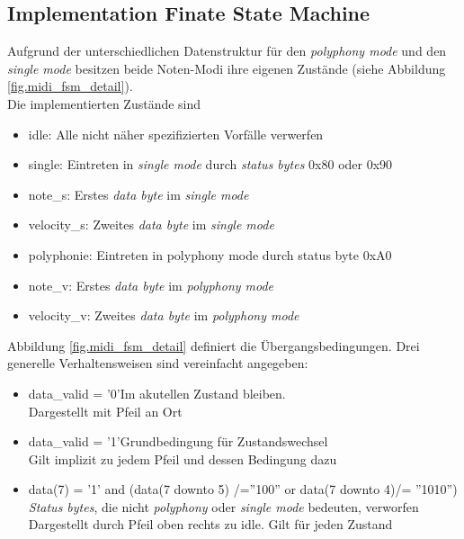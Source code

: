 \subsection{Implementation Finate State Machine}
Aufgrund der unterschiedlichen Datenstruktur für den \textit{polyphony mode} und den \textit{single mode} besitzen beide Noten-Modi ihre eigenen Zustände (siehe Abbildung \ref{fig.midi_fsm_detail}). \\ 
\newline
Die implementierten Zustände sind
\begin{itemize}
	\item idle: \hspace*{19mm}Alle nicht näher spezifizierten Vorfälle verwerfen
	\item single: \hspace*{16mm}Eintreten in  \textit{single mode} durch \textit{status bytes} 0x80 oder 0x90
	\item note\_s: \hspace*{15mm}Erstes \textit{data byte} im  \textit{single mode}
	\item velocity\_s: \hspace*{10mm}Zweites \textit{data byte} im \textit{single mode}
	\item polyphonie: \hspace*{8mm}Eintreten in polyphony mode durch status byte 0xA0
	\item note\_v:  \hspace*{15mm}Erstes \textit{data byte} im  \textit{polyphony mode}
	\item velocity\_v:  \hspace*{10mm}Zweites \textit{data byte} im  \textit{polyphony mode}
\end{itemize}


\newpage
Abbildung \ref{fig.midi_fsm_detail} definiert die Übergangsbedingungen. Drei generelle Verhaltensweisen sind vereinfacht angegeben:

\begin{itemize}
	\item data\_valid = '0'\hspace*{10mm}Im akutellen Zustand bleiben.\\
	 \hspace*{34mm}Dargestellt mit Pfeil an Ort
	\item data\_valid = '1'\hspace*{10mm}Grundbedingung für Zustandswechsel\\
	\hspace*{34mm}Gilt implizit zu jedem Pfeil und dessen Bedingung dazu
	\item data(7) = '1' and (data(7 downto 5) /=''100'' or data(7 downto 4)/= ''1010'') \hspace*{5mm} \\
	\hspace*{34mm}\textit{Status bytes}, die nicht \textit{polyphony} oder \textit{single mode} bedeuten, verworfen\\
	\hspace*{34mm}Dargestellt durch Pfeil oben rechts zu idle. Gilt für jeden Zustand
\end{itemize}
\bigskip


